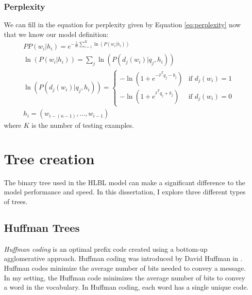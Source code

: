 \subsubsection{Perplexity}
We can fill in the equation for perplexity given by Equation \ref{eq:perplexity} now that we know our model definition:
\begin{align}
&PP(w_i | h_i)=e^{- \frac{1}{K} \sum_{i=1}^K \ln( P(w_i | h_i) ) }
\\
&\ln(P(w_i | h_i )) = \sum_j \ln(P(d_j(w_i) | q_j, h_i)) \nonumber
\\
&\ln(P(d_j(w_i) | q_j, h_i)) =  
\begin{cases}
  -\ln (1 + e^{-\hat{r}^T q_{j} -b_{j}}) & \text{if } d_j(w_i)  = 1 \\
  -\ln (1 + e^{\hat{r}^T q_{j} +b_{j}})     & \text{if } d_j(w_i) = 0
  \end{cases} \nonumber
\\
 & h_i = ( w_{i-(n-1)},\dots, w_{i-1} ) \nonumber
\end{align}
where $K$ is the number of testing examples. 


\section{Tree creation} \label{sec:treeCreation}
\paragraph{}
The binary tree used in the HLBL model can make a significant difference to the model performance and speed. In this dissertation, I explore three different types of trees.
\subsection{Huffman Trees}
\paragraph{}
\emph{Huffman coding} is an optimal prefix code created using a bottom-up agglomerative approach. Huffman coding was introduced by David Huffman in \cite{Huffman1952}. Huffman codes minimize the average number of bits needed to convey a message. In my setting, the Huffman code minimizes the average number of bits to convey a word in the vocabulary. In Huffman coding, each word has a single unique code.
